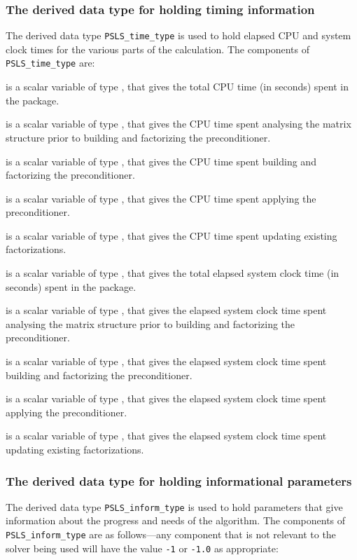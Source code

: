 \documentclass{galahad}
\newcommand{\packagename}{PSLS}
\begin{document}
\subsubsection{The derived data type for holding timing
 information}\label{typetime}
The derived data type
{\tt \packagename\_time\_type}
is used to hold elapsed CPU and system clock times for the various parts
of the calculation. The components of
{\tt \packagename\_time\_type}
are:
\begin{description}
 is a scalar variable of type \realdp, that gives
 the total CPU time (in seconds) spent in the package.

 is a scalar variable of type \realdp, that gives
 the CPU time spent analysing the matrix structure prior to building and
 factorizing the preconditioner.

 is a scalar variable of type \realdp, that gives
 the CPU time spent building and factorizing the preconditioner.

 is a scalar variable of type \realdp, that gives
 the CPU time spent applying the preconditioner.

 is a scalar variable of type \realdp, that gives
 the CPU time spent updating existing factorizations.

 is a scalar variable of type \realdp, that gives
 the total elapsed system clock time (in seconds) spent in the package.

 is a scalar variable of type \realdp, that gives
 the elapsed system clock time spent analysing the matrix structure prior to 
 building and factorizing the preconditioner.

 is a scalar variable of type \realdp, that gives
 the elapsed system clock time spent building and factorizing the 
 preconditioner.

 is a scalar variable of type \realdp, that gives
 the elapsed system clock time spent applying the preconditioner.

 is a scalar variable of type \realdp,
 that gives  the elapsed system clock time spent updating existing 
 factorizations.

\end{description}


\subsubsection{The derived data type for holding informational
 parameters}\label{typeinform}
The derived data type
{\tt \packagename\_inform\_type}
is used to hold parameters that give information about the progress and needs
of the algorithm. The components of
{\tt \packagename\_inform\_type}
are as follows---any component that is not relevant to the solver being used
will have the value {\tt -1} or {\tt -1.0} as appropriate:
\end{document}

